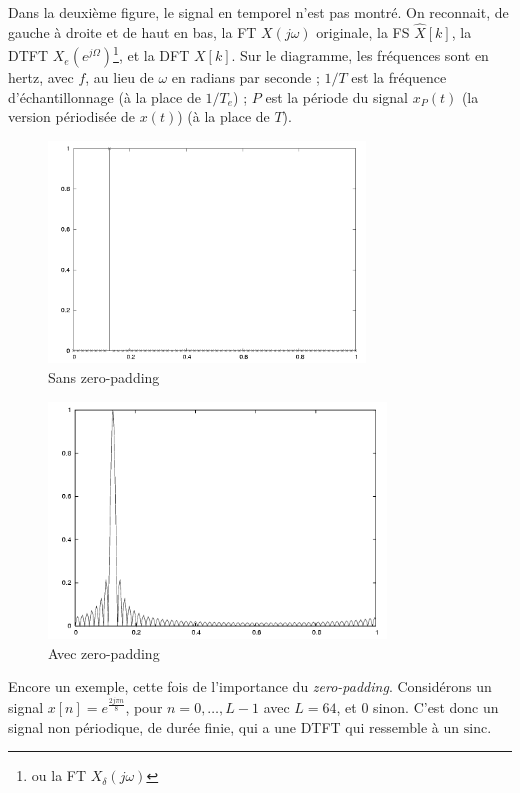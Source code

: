 \documentclass{article}
\begin{document}
Dans la deuxième figure, le signal en temporel n'est pas montré. On reconnait, de gauche à droite et de haut en bas, la FT $X(j\omega)$ originale, la FS $\hat{X}[k]$, la DTFT $X_e\left(e^{j\Omega}\right)$\footnote{ou la FT $X_\delta(j\omega)$}, et la DFT $X[k]$. Sur le diagramme, les fréquences sont en hertz, avec $f$, au lieu de $\omega$ en radians par seconde ; $1/T$ est la fréquence d'échantillonnage (à la place de $1/T_e$) ; $P$ est la période du signal $x_P(t)$ (la version périodisée de $x(t)$) (à la place de $T$).

\begin{figure}
	\centering
	\includegraphics[width=0.75\textwidth]{no-zeropad.png}
	\caption{Sans zero-padding}
	\label{fig:nozeropadding}
\end{figure}
\begin{figure}
	\centering
	\includegraphics[width=0.8\textwidth]{zeropad.png}
	\caption{Avec zero-padding}
	\label{fig:zeropadding}
\end{figure}

Encore un exemple, cette fois de l'importance du \emph{zero-padding}. Considérons un signal $x[n] = e^{\frac{2j\pi n}{8}}$, pour $n=0,\dots,L-1$ avec $L=64$, et $0$ sinon. C'est donc un signal non périodique, de durée finie, qui a une DTFT qui ressemble à un $\mathrm{sinc}$.
\end{document}
